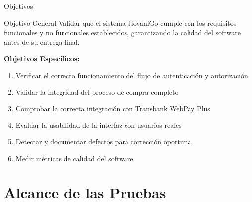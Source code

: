 \documentclass[aspectratio=169]{beamer}
\begin{document}
\begin{frame}{Objetivos}
\begin{block}{Objetivo General}
Validar que el sistema JiovaniGo cumple con los requisitos funcionales y no funcionales establecidos, garantizando la calidad del software antes de su entrega final.
\end{block}

\vspace{0.5cm}

\textbf{Objetivos Específicos:}
\begin{enumerate}
    \item Verificar el correcto funcionamiento del flujo de autenticación y autorización
    \item Validar la integridad del proceso de compra completo
    \item Comprobar la correcta integración con Transbank WebPay Plus
    \item Evaluar la usabilidad de la interfaz con usuarios reales
    \item Detectar y documentar defectos para corrección oportuna
    \item Medir métricas de calidad del software
\end{enumerate}
\end{frame}

\section{Alcance de las Pruebas}
\end{document}
